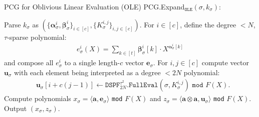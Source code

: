 \begin{specialconstruction}{PCG for Oblivious Linear Evaluation (OLE)}
PCG.Expand$_{\texttt{OLE}}(\sigma, k_\sigma)$:
\begin{algorithmic}[1]
\State Parse $k_\sigma $ as $(\{\boldsymbol{\alpha}_\sigma^i, \boldsymbol{\beta}_\sigma^i\}_{i\in[c]}, \{K_\sigma^{i,j}\}_{i,j\in[c]})$.
\State For $i \in [c]$, define the degree $< N$, $\tau$-sparse polynomial:
\begin{align*}
e^i_\sigma(X) = \sum_{k\in [t]} \boldsymbol{\beta}_\sigma^i[k] \cdot X^{\boldsymbol{\alpha}_\sigma^i[k]}
\end{align*}
and compose all $e^i_\sigma$ to a single length-$c$ vector $\boldsymbol{e}_\sigma$.
\State For $i, j \in [c]$ compute vector $\boldsymbol{u}_\sigma$ with each element being interpreted as a degree $< 2N$ polynomial:
\begin{align*}
& \boldsymbol{u}_\sigma[i+c(j-1)] \leftarrow \texttt{DSPF}^{\tau^2}_{2N}\texttt{.FullEval}(\sigma, K_\sigma^{i,j}) \texttt{ mod } F(X).
\end{align*}
\State Compute polynomials $x_\sigma = \langle\boldsymbol{a},\boldsymbol{e}_\sigma\rangle$ \texttt{mod} $F(X)$ and $z_\sigma = \langle\boldsymbol{a}\otimes\boldsymbol{a},\boldsymbol{u}_\sigma\rangle$ \texttt{mod} $F(X)$.
\State Output $(x_\sigma, z_\sigma)$.
\label{c:OLEBoyle}
\end{algorithmic}
\end{specialconstruction}

\vspace{1em}

